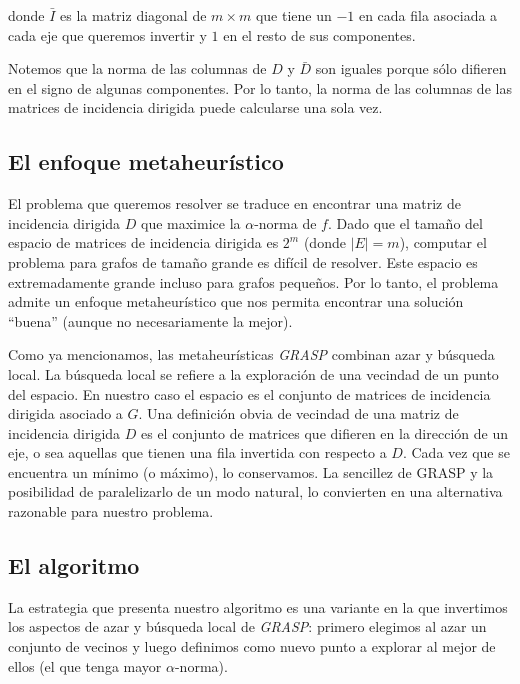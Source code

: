 \documentclass[conference,compsoc,a4paper]{IEEEtran}
\begin{document}
\smallskip

\noindent donde $\bar{I}$ es la matriz diagonal de $m \times m$ que tiene un $-1$ 
en cada fila asociada a cada eje que queremos invertir y $1$ en el resto 
de sus componentes.

\smallskip

Notemos que la norma de las columnas de $D$ y $\bar{D}$ son iguales 
porque sólo difieren en el signo de algunas componentes. Por lo tanto, 
la norma de las columnas de las matrices de incidencia dirigida puede 
calcularse una sola vez. 




\bigskip

\subsection{El enfoque metaheurístico}

El problema que queremos resolver se traduce en encontrar una matriz de 
incidencia dirigida $D$ que maximice la $\alpha$-norma de $f$. 
Dado que el tamaño del espacio de matrices de 
incidencia dirigida es $2^m$  (donde $|E|=m$), computar el problema
para grafos de tamaño grande es difícil de resolver. 
Este espacio es 
extremadamente grande incluso para grafos pequeños. Por lo tanto, el 
problema admite un enfoque metaheurístico que nos permita encontrar 
una solución ``buena'' (aunque no necesariamente la mejor).

\smallskip

Como ya mencionamos, las metaheurísticas \textit{GRASP} combinan azar y 
búsqueda local. La búsqueda local se refiere a la exploración de 
una vecindad de un punto del espacio. En nuestro caso el espacio es el 
conjunto de matrices de incidencia dirigida asociado a $G$. Una 
definición obvia de vecindad de una matriz de incidencia dirigida $D$ es 
el conjunto de matrices que difieren en la dirección de un eje, o sea 
aquellas que tienen una fila invertida con respecto a $D$. Cada vez que 
se encuentra un mínimo (o máximo), lo conservamos. La sencillez de 
GRASP y la posibilidad de paralelizarlo de un modo natural, lo 
convierten en una alternativa razonable para nuestro problema.

\subsection{El algoritmo}

La estrategia que presenta nuestro algoritmo es una variante en la que 
invertimos los aspectos de azar y búsqueda local de \textit{GRASP}: 
primero elegimos al azar un conjunto de vecinos y luego definimos como 
nuevo punto a explorar al mejor de ellos (el que tenga mayor 
$\alpha$-norma). 
\end{document}
